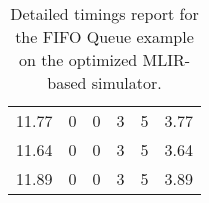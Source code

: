 \begin{table}[h]
{\begin{tabular}{cccccc}
            11.77              & 0                          & 0                          & 3                          & 5                          & 3.77                   \\
            11.64              & 0                          & 0                          & 3                          & 5                          & 3.64                   \\
            11.89              & 0                          & 0                          & 3                          & 5                          & 3.89                   \\
            \bottomrule
        \end{tabular}
    }
    \caption{Detailed timings report for the FIFO Queue example on the optimized MLIR-based simulator.}
\end{table}

